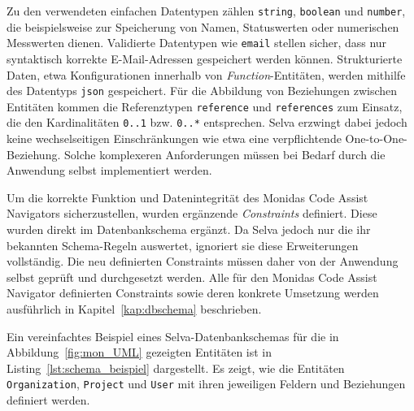 Zu den verwendeten einfachen Datentypen zählen \texttt{string}, \texttt{boolean} und \texttt{number}, die beispielsweise zur Speicherung von Namen, Statuswerten oder numerischen Messwerten dienen. Validierte Datentypen wie \texttt{email} stellen sicher, dass nur syntaktisch korrekte E-Mail-Adressen gespeichert werden können. Strukturierte Daten, etwa Konfigurationen innerhalb von \textit{Function}-Entitäten, werden mithilfe des Datentyps \texttt{json} gespeichert. Für die Abbildung von Beziehungen zwischen Entitäten kommen die Referenztypen \texttt{reference} und \texttt{references} zum Einsatz, die den Kardinalitäten \texttt{0..1} bzw. \texttt{0..*} entsprechen. Selva erzwingt dabei jedoch keine wechselseitigen Einschränkungen wie etwa eine verpflichtende One-to-One-Beziehung. Solche komplexeren Anforderungen müssen bei Bedarf durch die Anwendung selbst implementiert werden.



Um die korrekte Funktion und Datenintegrität des Monidas Code Assist Navigators sicherzustellen, wurden ergänzende \textit{Constraints} definiert. Diese wurden direkt im Datenbankschema ergänzt. Da Selva jedoch nur die ihr bekannten Schema-Regeln auswertet, ignoriert sie diese Erweiterungen vollständig. Die neu definierten Constraints müssen daher von der Anwendung selbst geprüft und durchgesetzt werden. Alle für den Monidas Code Assist Navigator definierten Constraints sowie deren konkrete Umsetzung werden ausführlich in Kapitel~\ref{kap:dbschema} beschrieben.

Ein vereinfachtes Beispiel eines Selva-Datenbankschemas für die in Abbildung~\ref{fig:mon_UML} gezeigten Entitäten ist in Listing~\ref{lst:schema_beispiel} dargestellt. Es zeigt, wie die Entitäten \texttt{Organization}, \texttt{Project} und \texttt{User} mit ihren jeweiligen Feldern und Beziehungen definiert werden.

\newpage



